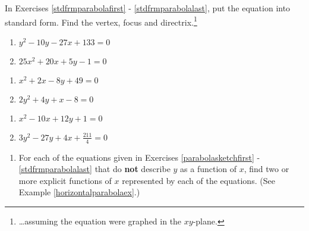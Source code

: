 \documentclass{ximera}
\begin{document}
In Exercises \ref{stdfrmparabolafirst} - \ref{stdfrmparabolalast}, put the equation into standard form.  Find the vertex, focus and directrix.\footnote{\ldots assuming the equation were graphed in the $xy$-plane.}

\begin{multicols}{2}
\begin{enumerate}
\setcounter{enumi}{\value{HW}}

\item  \label{paranotfcnfive} $y^{2} - 10y - 27x + 133 = 0$ \label{stdfrmparabolafirst}
\item $25x^{2} + 20x + 5y - 1 = 0$

\setcounter{HW}{\value{enumi}}
\end{enumerate}
\end{multicols}

\begin{multicols}{2}
\begin{enumerate}
\setcounter{enumi}{\value{HW}}

\item $x^2 + 2x - 8y + 49 = 0$
\item  \label{paranotfcnsix} $2y^2 + 4y +x - 8 = 0$

\setcounter{HW}{\value{enumi}}
\end{enumerate}
\end{multicols}

\begin{multicols}{2}
\begin{enumerate}
\setcounter{enumi}{\value{HW}}

\item $x^2-10x+12y+1=0$
\item   $3y^2-27y+4x+\frac{211}{4} = 0$ \label{stdfrmparabolalast}   \label{paranotfcnseven} 

\setcounter{HW}{\value{enumi}}
\end{enumerate}
\end{multicols}

\begin{enumerate}
\setcounter{enumi}{\value{HW}}


\item For each of the equations given in Exercises \ref{parabolasketchfirst} - \ref{stdfrmparabolalast} that do \textbf{not} describe $y$ as a function of $x$, find two or more explicit functions of $x$ represented by each of the equations.  (See Example \ref{horizontalparabolaex}.)


\setcounter{HW}{\value{enumi}}
\end{enumerate}
\end{document}

